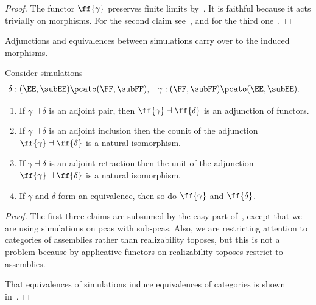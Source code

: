 \begin{proof}
  The functor $\ff{\gamma}$ preserves finite limits
  by~\cite[Proposition~2.2.2]{Longley:94}. It is faithful
  because it acts trivially on morphisms.
  For the second claim see~\cite[Theorem~2.4.12]{Longley:94}, and for the third one~\cite[Theorem~2.4.19]{Longley:94}.
\end{proof}

Adjunctions and equivalences between simulations carry over to the induced morphisms.

\begin{theorem}
  \label{th:applicative_adjunction_functor_adjunction}%
  Consider simulations
  \begin{align*}
    \delta &: (\EE, \subEE) \pcato (\FF, \subFF),
    &
    \gamma &: (\FF, \subFF) \pcato (\EE, \subEE).
  \end{align*}
  \begin{enumerate}
  \item If $\gamma \dashv \delta$ is an adjoint pair, then
    $\ff{\gamma} \dashv \ff{\delta}$ is an adjunction of functors.
  \item If $\gamma \dashv \delta$ is an adjoint inclusion then the counit of the adjunction $\ff{\gamma} \dashv \ff{\delta}$ is a natural isomorphism.
  \item If $\gamma \dashv \delta$ is an adjoint retraction then the unit of the adjunction $\ff{\gamma} \dashv \ff{\delta}$ is a natural isomorphism.
  \item If $\gamma$ and $\delta$ form an equivalence, then so do $\ff{\gamma}$ and
    $\ff{\delta}$.
  \end{enumerate}
\end{theorem}

\begin{proof}
  The first three claims are subsumed by the easy part of~\cite[Proposition 2.5.9]{Longley:94}, except that we are using simulations on pcas with sub-pcas. Also, we are restricting attention to categories of assemblies rather than realizability toposes, but this is not a problem because by applicative functors on realizability toposes restrict to assemblies.

  That equivalences of simulations induce equivalences of categories is shown in~\cite[Theorem 2.5.6]{Longley:94}.
\end{proof}

